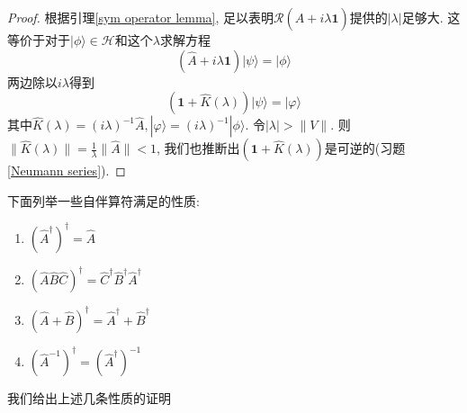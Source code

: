 \documentclass[a4paper,11pt]{book}
\newtheorem{proof}{证明}[section]
\begin{document}
\begin{proof}
  根据引理\ref{sym operator lemma}, 足以表明$\mathcal{R}(\hat{A}+i\lambda\mathbf{1})$提供的$|\lambda|$足够大. 这等价于对于$|\phi\rangle\in\mathcal{H}$和这个$\lambda$求解方程
\begin{equation*}
  (\hat{A}+i\lambda\mathbf{1})|\psi\rangle=|\phi\rangle
\end{equation*}
两边除以$i\lambda$得到
\begin{equation*}
  (\mathbf{1}+\hat{K}(\lambda))|\psi\rangle=|\varphi\rangle
\end{equation*}
其中$\hat{K}(\lambda)=(i\lambda)^{-1}\hat{A}, |\varphi\rangle=(i\lambda)^{-1}|\phi\rangle$. 令$|\lambda|>\|V\|$. 则$\|\hat{K}(\lambda)\|=\frac{1}{\lambda}\|\hat{A}\|<1$, 我们也推断出$(\mathbf{1}+\hat{K}(\lambda))$是可逆的(习题\ref{Neumann series}).
\end{proof}
下面列举一些自伴算符满足的性质:
\begin{enumerate}[(1)]
  \item\label{self-adjoint prop 1} $(\hat{A}^\dag)^\dag=\hat{A}$
  \item\label{self-adjoint prop 2} $(\hat{A}\hat{B}\hat{C})^\dag=\hat{C}^\dag\hat{B}^\dag\hat{A}^\dag$
  \item\label{self-adjoint prop 3} $(\hat{A}+\hat{B})^\dag=\hat{A}^\dag+\hat{B}^\dag$
  \item\label{self-adjoint prop 4} $(\hat{A}^{-1})^\dag=(\hat{A}^\dag)^{-1}$
\end{enumerate}
我们给出上述几条性质的证明
\end{document}
